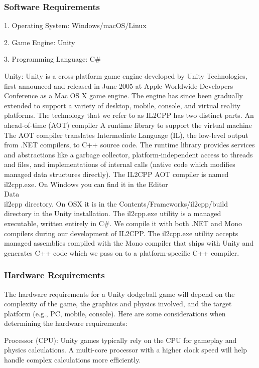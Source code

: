 \documentclass[12pt]{report}
\begin{document}
\subsubsection{Software Requirements}

\normalsize

1. Operating System: Windows/macOS/Linux 

2. Game Engine: Unity 

3. Programming Language: C\#

Unity: Unity is a cross-platform game engine developed by Unity Technologies, first announced and released in June 2005 at Apple Worldwide Developers Conference as a Mac OS X game engine. The engine has since been gradually extended to support a variety of desktop, mobile, console, and virtual reality platforms.
The technology that we refer to as IL2CPP has two distinct parts.
An ahead-of-time (AOT) compiler
A runtime library to support the virtual machine
The AOT compiler translates Intermediate Language (IL), the low-level output from .NET compilers, to C++ source code. The runtime library provides services and abstractions like a garbage collector, platform-independent access to threads and files, and implementations of internal calls (native code which modifies managed data structures directly).
The IL2CPP AOT compiler is named il2cpp.exe. On Windows you can find it in the Editor\\Data\\il2cpp directory. On OSX it is in the Contents/Frameworks/il2cpp/build directory in the Unity installation. The il2cpp.exe utility is a managed executable, written entirely in C\#. We compile it with both .NET and Mono compilers during our development of IL2CPP.
The il2cpp.exe utility accepts managed assemblies compiled with the Mono compiler that ships with Unity and generates C++ code which we pass on to a platform-specific C++ compiler.

\subsubsection{Hardware Requirements}
\hspace{1.7cm}
The hardware requirements for a Unity dodgeball game will depend on the complexity of the game, the graphics and physics involved, and the target platform (e.g., PC, mobile, console). Here are some considerations when determining the hardware requirements:

Processor (CPU): Unity games typically rely on the CPU for gameplay and physics calculations. A multi-core processor with a higher clock speed will help handle complex calculations more efficiently.
\end{document}
